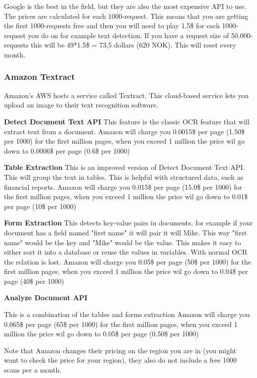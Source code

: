 Google is the best in the field, but they are also the most expensive API to use.
The prices are calculated for each 1000-request.
This means that you are getting the first 1000-requests free and then you will need to play 1.5\$ for each 1000-request you do on for example text detection.
If you have a request size of 50.000-requests this will be 49*1.5\$ = 73,5 dollars (620 NOK).
This will reset every month.

\subsubsection{Amazon Textract}\label{subsubsec:API_Amazon}

Amazon's AWS hosts a service called Textract.
This cloud-based service lets you upload an image to their text recognition software.

\textbf{Detect Document Text API}
This feature is the classic OCR feature that will extract text from a document.
Amazon will charge you 0.0015\$ per page (1.50\$ per 1000) for the first million pages, when you exceed 1 million the price wil go down to
0.0006\$ per page (0.6\$ per 1000)

\textbf{Table Extraction}
This is an improved version of Detect Document Text API. This will group the text in tables.
This is helpful with structured data, such as financial reports.
Amazon will charge you 0.015\$ per page (15.0\$ per 1000) for the first million pages, when you exceed 1 million the price wil go down to
0.01\$ per page (10\$ per 1000)

\textbf{Form Extraction}
This detects key-value pairs in documents, for example if your document has a field named "first name" it will pair it will Mike.
This way "first name" would be the key and "Mike" would be the value.
This makes it easy to either sort it into a database or reuse the values in variables.
With normal OCR the relation is lost.
Amazon will charge you 0.05\$ per page (50\$ per 1000) for the first million pages, when you exceed 1 million the price wil go down to
0.04\$ per page (40\$ per 1000)

\textbf{Analyze Document API}

This is a combination of the tables and forms extraction
Amazon will charge you 0.065\$ per page (65\$ per 1000) for the first million pages, when you exceed 1 million the price wil go down to
0.05\$ per page (0.50\$ per 1000)

Note that Amazon changes their pricing on the region you are in (you might want to check the price for your region), they also do not include a free 1000 scans per a month.

